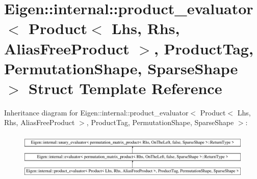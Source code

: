 \hypertarget{struct_eigen_1_1internal_1_1product__evaluator_3_01_product_3_01_lhs_00_01_rhs_00_01_alias_free_0706ef7a5a2e7de13f2e1755913a650d}{}\section{Eigen\+::internal\+::product\+\_\+evaluator$<$ Product$<$ Lhs, Rhs, Alias\+Free\+Product $>$, Product\+Tag, Permutation\+Shape, Sparse\+Shape $>$ Struct Template Reference}
\label{struct_eigen_1_1internal_1_1product__evaluator_3_01_product_3_01_lhs_00_01_rhs_00_01_alias_free_0706ef7a5a2e7de13f2e1755913a650d}
Inheritance diagram for Eigen\+::internal\+::product\+\_\+evaluator$<$ Product$<$ Lhs, Rhs, Alias\+Free\+Product $>$, Product\+Tag, Permutation\+Shape, Sparse\+Shape $>$\+:\begin{figure}[H]
\begin{center}
\leavevmode
\includegraphics[height=2.304527cm]{struct_eigen_1_1internal_1_1product__evaluator_3_01_product_3_01_lhs_00_01_rhs_00_01_alias_free_0706ef7a5a2e7de13f2e1755913a650d}
\end{center}
\end{figure}

